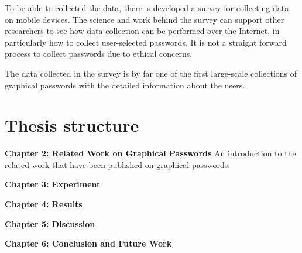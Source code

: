 		To be able to collected the data, there is developed a survey for collecting data on mobile devices. The science and work behind the survey can support other researchers to see how data collection can be performed over the Internet, in particularly how to collect user-selected passwords. It is not a straight forward process to collect passwords due to ethical concerns. 

		The data collected in the survey is by far one of the first large-scale collections of graphical passwords with the detailed information about the users.

	\section{Thesis structure} \label{sec:structure}

		{\bf Chapter 2: Related Work on Graphical Passwords}
		An introduction to the related work that have been published on graphical passwords. 

    {\bf Chapter 3: Experiment}

    {\bf Chapter 4: Results}

    {\bf Chapter 5: Discussion}

    {\bf Chapter 6: Conclusion and Future Work}


